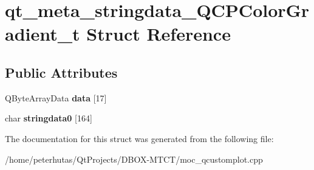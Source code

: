 \hypertarget{structqt__meta__stringdata___q_c_p_color_gradient__t}{}\section{qt\+\_\+meta\+\_\+stringdata\+\_\+\+Q\+C\+P\+Color\+Gradient\+\_\+t Struct Reference}
\label{structqt__meta__stringdata___q_c_p_color_gradient__t}
\subsection*{Public Attributes}
\begin{DoxyCompactItemize}
\item 
\mbox{\label{structqt__meta__stringdata___q_c_p_color_gradient__t_a4b1142eed666e972a34a24fbcd9338e7}} 
Q\+Byte\+Array\+Data {\bfseries data} \mbox{[}17\mbox{]}
\item 
\mbox{\label{structqt__meta__stringdata___q_c_p_color_gradient__t_af6991165899703d0e9df570ab79718c3}} 
char {\bfseries stringdata0} \mbox{[}164\mbox{]}
\end{DoxyCompactItemize}


The documentation for this struct was generated from the following file\+:\begin{DoxyCompactItemize}
\item 
/home/peterhutas/\+Qt\+Projects/\+D\+B\+O\+X-\/\+M\+T\+C\+T/moc\+\_\+qcustomplot.\+cpp\end{DoxyCompactItemize}
